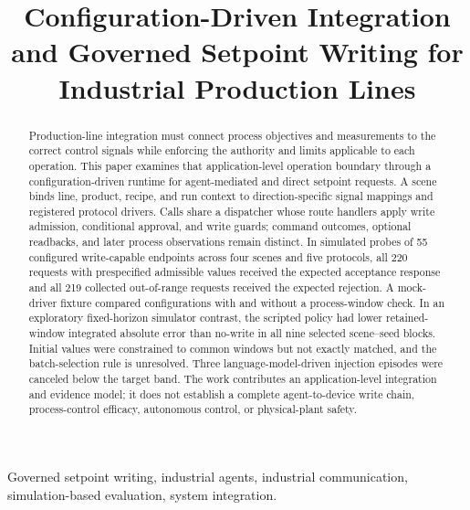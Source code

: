 \documentclass[journal]{IEEEtran}
\begin{document}

\title{Configuration-Driven Integration and Governed Setpoint Writing for Industrial Production Lines}

\author{}

\maketitle

\begin{abstract}
Production-line integration must connect process objectives and measurements to the correct control signals while enforcing the authority and limits applicable to each operation. This paper examines that application-level operation boundary through a configuration-driven runtime for agent-mediated and direct setpoint requests. A scene binds line, product, recipe, and run context to direction-specific signal mappings and registered protocol drivers. Calls share a dispatcher whose route handlers apply write admission, conditional approval, and write guards; command outcomes, optional readbacks, and later process observations remain distinct. In simulated probes of 55 configured write-capable endpoints across four scenes and five protocols, all 220 requests with prespecified admissible values received the expected acceptance response and all 219 collected out-of-range requests received the expected rejection. A mock-driver fixture compared configurations with and without a process-window check. In an exploratory fixed-horizon simulator contrast, the scripted policy had lower retained-window integrated absolute error than no-write in all nine selected scene--seed blocks. Initial values were constrained to common windows but not exactly matched, and the batch-selection rule is unresolved. Three language-model-driven injection episodes were canceled below the target band. The work contributes an application-level integration and evidence model; it does not establish a complete agent-to-device write chain, process-control efficacy, autonomous control, or physical-plant safety.
\end{abstract}

\begin{IEEEkeywords}
Governed setpoint writing, industrial agents, industrial communication,
simulation-based evaluation, system integration.
\end{IEEEkeywords}
\end{document}
